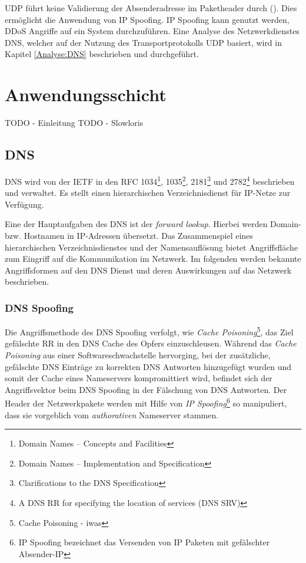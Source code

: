 \ac{UDP} führt keine Validierung der Absenderadresse im Paketheader durch (\cite{UDP2003}). Dies ermöglicht die Anwendung von \ac{IP} Spoofing. \ac{IP} Spoofing kann genutzt werden, \ac{DDoS} Angriffe auf ein System durchzuführen. Eine Analyse des Netzwerkdienstes \ac{DNS}, welcher auf der Nutzung des Transportprotokolls \ac{UDP} basiert, wird in Kapitel \autoref{Analyse:DNS} beschrieben und durchgeführt.

\section{Anwendungsschicht}
\label{Analyse:Anwendungsschicht}
TODO - Einleitung
TODO - Slowloris

\subsection{\ac{DNS}}
\label{Analyse:DNS}
\ac{DNS} wird von der \ac{IETF} in den \ac{RFC} 1034\footnote{Domain Names – Concepts and Facilities}, 1035\footnote{Domain Names – Implementation and Specification}, 2181\footnote{Clarifications to the DNS Specification} und 2782\footnote{A DNS RR for specifying the location of services (DNS SRV)} beschrieben und verwaltet. Es stellt einen hierarchischen Verzeichnisdienst für \ac{IP}-Netze zur Verfügung. 

Eine der Hauptaufgaben des \ac{DNS} ist der \textit{forward lookup}. Hierbei werden Domain- bzw. Hostnamen in \ac{IP}-Adressen übersetzt. Das Zusammenspiel eines hierarchischen Verzeichnisdienstes und der Namensauflösung bietet Angriffsfläche zum Eingriff auf die Kommunikation im Netzwerk. Im folgenden werden bekannte Angriffsformen auf den \ac{DNS} Dienst und deren Auswirkungen auf das Netzwerk beschrieben.

\subsubsection{\ac{DNS} Spoofing}
Die Angriffsmethode des \ac{DNS} Spoofing verfolgt, wie \textit{Cache Poisoning}\footnote{Cache Poisoning - iwas}, das Ziel gefälschte \ac{RR} in den \ac{DNS} Cache des Opfers einzuschleusen. Während das \textit{Cache Poisoning} aus einer Softwareschwachstelle hervorging, bei der zusätzliche, gefälschte \ac{DNS} Einträge zu korrekten \ac{DNS} Antworten hinzugefügt wurden und somit der Cache eines Nameservers kompromittiert wird, befindet sich der Angriffsvektor beim \ac{DNS} Spoofing in der Fälschung von \ac{DNS} Antworten. Der Header der Netzwerkpakete werden mit Hilfe von \textit{IP Spoofing}\footnote{IP Spoofing bezeichnet das Versenden von IP Paketen mit gefälschter Absender-IP} so manipuliert, dass sie vorgeblich vom \textit{authorativen} Nameserver stammen. 

